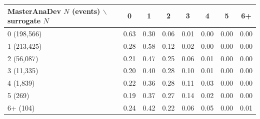 \begin{tabular}{lccccccc}
\toprule
MasterAnaDev $N$ (events) $\backslash$ surrogate $N$ & 0 & 1 & 2 & 3 & 4 & 5 & 6+ \\
\midrule
0 (198,566) & 0.63 & 0.30 & 0.06 & 0.01 & 0.00 & 0.00 & 0.00 \\
1 (213,425) & 0.28 & 0.58 & 0.12 & 0.02 & 0.00 & 0.00 & 0.00 \\
2 (56,087) & 0.21 & 0.47 & 0.25 & 0.06 & 0.01 & 0.00 & 0.00 \\
3 (11,335) & 0.20 & 0.40 & 0.28 & 0.10 & 0.01 & 0.00 & 0.00 \\
4 (1,839) & 0.22 & 0.36 & 0.28 & 0.11 & 0.03 & 0.00 & 0.00 \\
5 (269) & 0.19 & 0.37 & 0.27 & 0.14 & 0.02 & 0.00 & 0.00 \\
6+ (104) & 0.24 & 0.42 & 0.22 & 0.06 & 0.05 & 0.00 & 0.01 \\
\bottomrule
\end{tabular}
